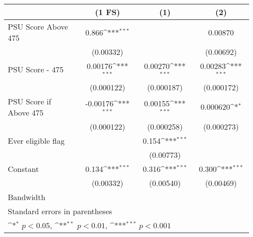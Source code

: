 {
\def\sym#1{\ifmmode^{#1}\else\(^{#1}\)\fi}
\begin{tabular}{l*{3}{c}}
\hline\hline
                    &\multicolumn{1}{c}{(1 FS)}&\multicolumn{1}{c}{(1)}&\multicolumn{1}{c}{(2)}\\
\hline
PSU Score Above 475 &       0.866\sym{***}&                     &     0.00870         \\
                    &   (0.00332)         &                     &   (0.00692)         \\
[1em]
PSU Score - 475     &     0.00176\sym{***}&     0.00270\sym{***}&     0.00283\sym{***}\\
                    &  (0.000122)         &  (0.000187)         &  (0.000172)         \\
[1em]
PSU Score if Above 475&    -0.00176\sym{***}&     0.00155\sym{***}&    0.000620\sym{*}  \\
                    &  (0.000122)         &  (0.000258)         &  (0.000273)         \\
[1em]
Ever eligible flag  &                     &       0.154\sym{***}&                     \\
                    &                     &   (0.00773)         &                     \\
[1em]
Constant            &       0.134\sym{***}&       0.316\sym{***}&       0.300\sym{***}\\
                    &   (0.00332)         &   (0.00540)         &   (0.00469)         \\
\hline
Bandwidth           &                     &                     &                     \\
\hline\hline
\multicolumn{4}{l}{\footnotesize Standard errors in parentheses}\\
\multicolumn{4}{l}{\footnotesize \sym{*} \(p<0.05\), \sym{**} \(p<0.01\), \sym{***} \(p<0.001\)}\\
\end{tabular}
}
